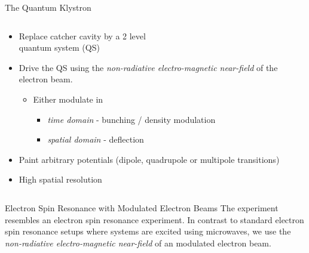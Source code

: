 \documentclass[final]{beamer}
\begin{document}
\begin{frame}[fragile]{}
\begin{columns}[T]
\begin{column}{.49\linewidth}
\begin{block}{\Large The Quantum Klystron}
\begin{columns}
\begin{column}{0.55\columnwidth}
            \begin{itemize}
              \item Replace catcher cavity by a 2 level\\quantum system (QS)
              \item Drive the QS using the \textit{non-radiative electro-magnetic near-field}
                    of the electron beam.
              \begin{itemize}
                \item Either modulate in
                \begin{itemize}
                    \item \textit{time domain} - bunching / density modulation
                    \item \textit{spatial domain} - deflection
                \end{itemize}
              \end{itemize}
              \item Paint arbitrary potentials (dipole, quadrupole or multipole transitions)
              \item High spatial resolution %
            \end{itemize}
          \end{column}
        \end{columns}
      \end{block}

      \begin{block}{\Large Electron Spin Resonance with Modulated Electron Beams}
        The experiment resembles an electron spin resonance experiment. In contrast to
        standard electron spin resonance setups where systems are excited using microwaves,
        we use the \textit{non-radiative electro-magnetic near-field} of an modulated electron beam.


\end{block}
\end{column}
\end{columns}
\end{frame}
\end{document}
